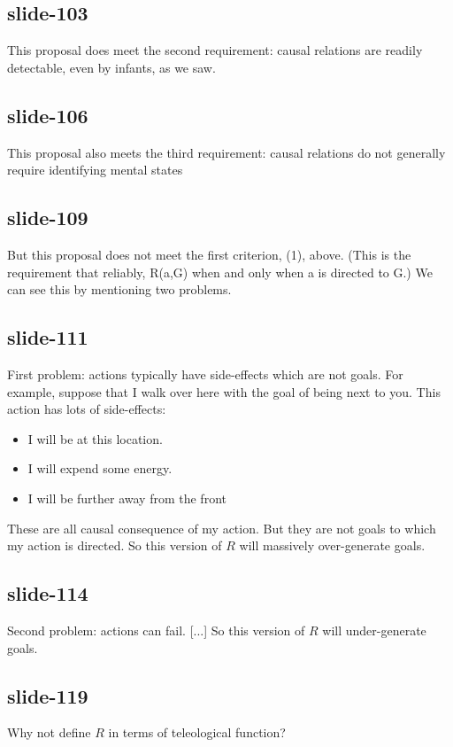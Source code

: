\documentclass[12pt,\papersize]{extarticle}
\begin{document}
 
\subsection{slide-103}
This proposal does meet the second requirement: causal relations are readily detectable, even by infants, as we saw.
 
 
\subsection{slide-106}
This proposal also meets the third requirement: causal relations do not generally require identifying mental states
 
 
\subsection{slide-109}
But this proposal does not meet the first criterion, (1), above. (This is the requirement that reliably, R(a,G) when and only when a is directed to G.) We can see this by mentioning two problems.
 
 
\subsection{slide-111}
First problem: actions typically have side-effects which are not goals. For example, suppose that I walk over here with the goal of being next to you. This action has lots of side-effects: \begin{itemize} \item I will be at this location. \item I will expend some energy. \item I will be further away from the front \end{itemize} These are all causal consequence of my action. But they are not goals to which my action is directed. So this version of $R$ will massively over-generate goals.
 
 
\subsection{slide-114}
Second problem: actions can fail. [...] So this version of $R$ will under-generate goals.
 
 
\subsection{slide-119}
Why not define $R$ in terms of teleological function?
 
\end{document}
